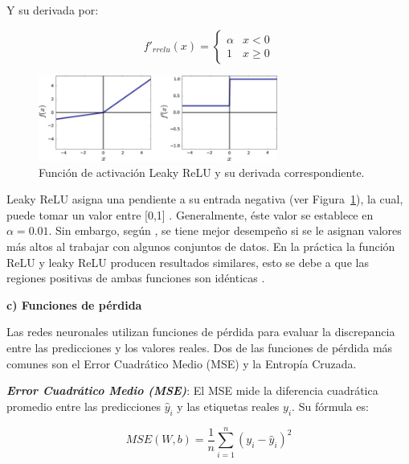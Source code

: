 Y su derivada por:

\begin{equation}
    {f}'_{rrelu}(x) = \left\{\begin{matrix}
        \alpha & x < 0         \\
        1      & x \geqslant 0
    \end{matrix}\right.
\end{equation}

\begin{figure}[H]
    \begin{center}
        \includegraphics[width=0.7\textwidth]{Images/leaky-relu.png}
    \end{center}
    \caption{Función de activación Leaky ReLU y su derivada correspondiente.}
    \label{fig:leaky-relu}
\end{figure}

Leaky ReLU asigna una pendiente a su entrada negativa (ver Figura~\ref{fig:leaky-relu}), la cual, puede tomar un valor entre [0,1] \cite{castaneda2019evaluation}. Generalmente, éste valor se establece en $ \alpha = 0.01 $. Sin embargo, según \cite{xu2015empirical}, se tiene mejor desempeño si se le asignan valores más altos al trabajar con algunos conjuntos de datos. En la práctica la función ReLU y leaky ReLU producen resultados similares, esto se debe a que las regiones positivas de ambas funciones son idénticas \cite{aghdam2017guide}.

\textbf{c) Funciones de pérdida}

Las redes neuronales utilizan funciones de pérdida para evaluar la discrepancia entre las predicciones y los valores reales. Dos de las funciones de pérdida más comunes son el Error Cuadrático Medio (MSE) y la Entropía Cruzada.

\textbf{\textit{Error Cuadrático Medio (MSE)}}: El MSE mide la diferencia cuadrática promedio entre las predicciones \(\hat{y}_i\) y las etiquetas reales \(y_i\). Su fórmula es:

\begin{equation}
    MSE(W, b) = \frac{1}{n} \sum_{i=1}^{n} (y_i - \hat{y}_i)^2
\end{equation}

